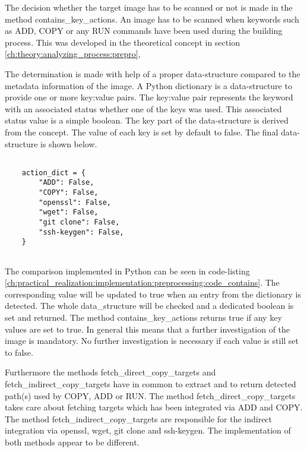 The decision whether the target image has to be scanned or not is made in the method contains\_key\_actions.
An image has to be scanned when keywords such as ADD, COPY or any RUN commands have been used during the building process. 
This was developed in the theoretical concept in section \ref{ch:theory:analyzing_process:prepro}, 

The determination is made with help of a proper data-structure compared to the metadata information of the image.
A Python dictionary is a data-structure to provide one or more key:value pairs.
The key:value pair represents the keyword with an associated status whether one of the keys was used. 
This associated status value is a simple boolean.
The key part of the data-structure is derived from the concept. 
The value of each key is set by default to false. 
The final data-structure is shown below.
\lstset{language=Python}          %
\begin{lstlisting}[]  % Start your code-block
	
    action_dict = {
        "ADD": False,
        "COPY": False,
        "openssl": False,
        "wget": False,
        "git clone": False,
        "ssh-keygen": False,
    }
    
\end{lstlisting}
The comparison implemented in Python can be seen in code-listing \ref{ch:practical_realization:implementation:preprocessing:code_contains}. 
The corresponding value will be updated to true when an entry from the dictionary is detected. 
The whole data\_structure will be checked and a dedicated boolean is set and returned. 
The method contains\_key\_actions returns true if any key values are set to true. 
In general this means that a further investigation of the image is mandatory. 
No further investigation is necessary if each value is still set to false.

Furthermore the methods fetch\_direct\_copy\_targets and fetch\_indirect\_copy\_targets have in common to extract and to return detected path(s) used by COPY, ADD or RUN. 
The method fetch\_direct\_copy\_targets takes care about fetching targets which has been integrated via ADD and COPY. 
The method fetch\_indirect\_copy\_targets are responsible for the indirect integration via openssl, wget, git clone and ssh-keygen. 
The implementation of both methods appear to be different.


